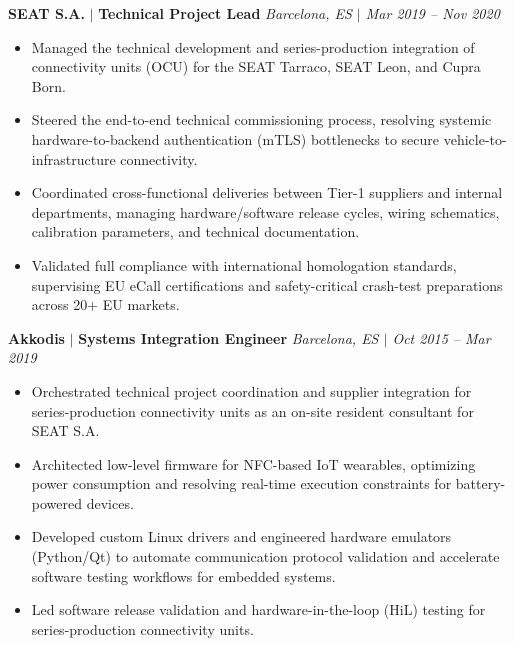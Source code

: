 \documentclass[a4paper,10pt]{article}
\begin{document}
\vspace{6pt}
\textbf{SEAT S.A.} $|$ \textbf{Technical Project Lead} \hfill \textit{Barcelona, ES $|$ Mar 2019 -- Nov 2020}
\begin{itemize}
\item Managed the technical development and series-production integration of connectivity units (OCU) for the SEAT Tarraco, SEAT Leon, and Cupra Born.
\item Steered the end-to-end technical commissioning process, resolving systemic hardware-to-backend authentication (mTLS) bottlenecks to secure vehicle-to-infrastructure connectivity.
\item Coordinated cross-functional deliveries between Tier-1 suppliers and internal departments, managing hardware/software release cycles, wiring schematics, calibration parameters, and technical documentation.
\item Validated full compliance with international homologation standards, supervising EU eCall certifications and safety-critical crash-test preparations across 20+ EU markets.
\end{itemize}

\vspace{6pt}
\textbf{Akkodis} $|$ \textbf{Systems Integration Engineer} \hfill \textit{Barcelona, ES $|$ Oct 2015 -- Mar 2019}
\begin{itemize}
\item Orchestrated technical project coordination and supplier integration for series-production connectivity units as an on-site resident consultant for SEAT S.A.
\item Architected low-level firmware for NFC-based IoT wearables, optimizing power consumption and resolving real-time execution constraints for battery-powered devices.
\item Developed custom Linux drivers and engineered hardware emulators (Python/Qt) to automate communication protocol validation and accelerate software testing workflows for embedded systems.
\item Led software release validation and hardware-in-the-loop (HiL) testing for series-production connectivity units.
\end{itemize}
\end{document}
